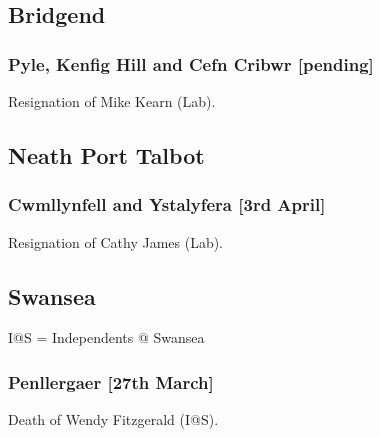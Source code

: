 \documentclass[a4paper,openany]{book}
\begin{document}
\begin{resultsiii}
\subsection*{Bridgend}

\subsubsection*{Pyle, Kenfig Hill and Cefn Cribwr \hspace*{\fill}\nolinebreak[1]%
	\enspace\hspace*{\fill}
	[pending]}


Resignation of Mike Kearn (Lab).

\subsection*{Neath Port Talbot}

\subsubsection*{Cwmllynfell and Ystalyfera \hspace*{\fill}\nolinebreak[1]%
	\enspace\hspace*{\fill}
	[3rd April]}


Resignation of Cathy James (Lab).

\subsection*{Swansea}

I@S = Independents @ Swansea

\subsubsection*{Penllergaer \hspace*{\fill}\nolinebreak[1]%
	\enspace\hspace*{\fill}
	[27th March]}


Death of Wendy Fitzgerald (I@S).


\end{resultsiii}
\end{document}
